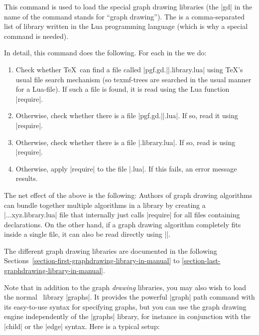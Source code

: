 \begin{command}{\usegdlibrary{}}
  This command is used to load the special graph drawing libraries
  (the |gd| in the name of the command stands for ``graph
  drawing''). The  is a comma-separated list
  of library written in the Lua programming language (which is why a
  special command is needed).

  In detail, this command does the following. For each  in
  the  we do:
  \begin{enumerate}
  \item Check whether \TeX\ can find a file called
    |pgf.gd.||.library.lua| using \TeX's usual file search
    mechanism (so texmf-trees are searched in the usual manner for a
    Lua-file). If such a file is found, it is read using the Lua
    function |require|.
  \item Otherwise, check whether there is a file
    |pgf.gd.||.lua|. If so, read it using |require|.
  \item Otherwise, check whether there is a file
    |.library.lua|. If so, read is using |require|.
  \item Otherwise, apply |require| to the file |.lua|. If
    this fails, an error message results.
  \end{enumerate}
  The net effect of the above is the following: Authors of graph
  drawing algorithms can bundle together multiple algorithms in a
  library by creating a |...xyz.library.lua| file that internally just
  calls |require| for all files containing declarations. On the other
  hand, if a graph drawing algorithm completely fits inside a single
  file, it can also be read directly using |\usegdlibrary|.
\begin{codeexample}
\usetikzlibrary{graphdrawing}
\end{codeexample}

  The different graph drawing libraries are documented in the following
  Sections~\ref{section-first-graphdrawing-library-in-manual} to
  \ref{section-last-graphdrawing-library-in-manual}.
\end{command}

Note that in addition to the graph \emph{drawing} libraries, you may
also wish to load the normal \tikzname\ library |graphs|. It provides
the powerful |graph| path command with its easy-to-use syntax for
specifying graphs, but you can use the graph drawing engine
independently of the |graphs| library, for instance in conjunction
with the |child| or the |edge| syntax. Here is a typical setup:

